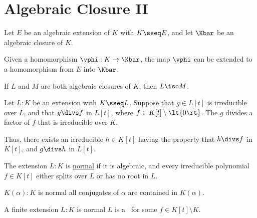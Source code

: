 \documentclass[a4paper]{article}
\begin{document}
\section{Algebraic Closure II}
\begin{ttheorem}
  Let \( E \) be an algebraic extension of \( K \) with \( K\sseq E \), and let \( \Kbar \) be an algebraic closure of \( K \).

  Given a homomorphism \( \vphi:K\to \Kbar \), the map \( \vphi \) can be extended to a homomorphism from \( E \) into \( \Kbar \).
\end{ttheorem}

\begin{ttheorem}

  If \( L \) and \( M \) are both algebraic closures of \( K \), then \( L \iso M \).
\end{ttheorem}

\begin{tcorollary}
  Let \( L:K \) be an extension with \( K\sseq L \).
  Suppose that \( g\in L[t] \) is irreducible over \( L \), and that \( g\divs f \) in \( L[t] \), where \( f\in K[t]\setminus \lt\{ 0 \rt\} \).
  The \( g \) divides a factor of \( f \) that is irreducible over \( K \).

  Thus, there exists an irreducible \( h\in K[t] \) having the property that \( h\divs f \) in \( K[t] \), and \( g\divs h \) in \( L[t] \).
\end{tcorollary}

\begin{tdefinition}
  The extension \( L:K \) is \ul{normal} if it is algebraic, and every irreducible polynomial \( f\in K[t] \) either splits over \( L \) or has no root in \( L \).
\end{tdefinition}

\begin{ttheorem}
  \( K(\alpha):K \) is normal \iff all conjugates of \( \alpha \) are contained in \( K(\alpha) \).
\end{ttheorem}

\begin{ttheorem}
  A finite extension \( L:K \) is normal \iff \( L \) is a \sfe~for some \( f\in K[t]\setminus K \).
\end{ttheorem}
\end{document}
